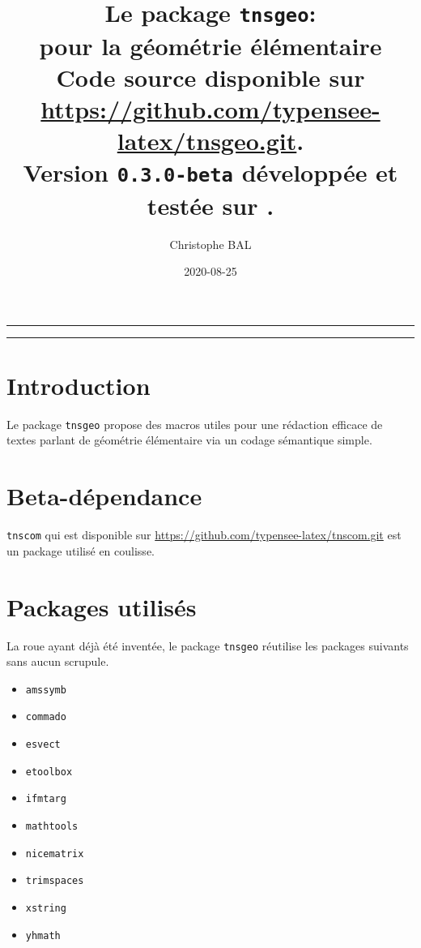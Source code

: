 \documentclass[12pt,a4paper]{article}
\theoremstyle{definition}
\begin{document}
\renewcommand\labelitemi{\raisebox{0.125em}{\tiny\textbullet}}
\renewcommand{\labelitemii}{---}

\title{  %
	Le package \texttt{tnsgeo}:\\%
	pour la géométrie élémentaire\\%
	{\footnotesize Code source disponible sur \url{https://github.com/typensee-latex/tnsgeo.git}.}\\%
{\footnotesize Version \texttt{0.3.0-beta} développée et testée sur \macosxname{}.}%
}
\author{Christophe BAL}
\date{2020-08-25}

\maketitle


\vspace{2em}

\hrule

\tableofcontents

\vspace{1.5em}

\hrule

\newpage

\section{Introduction}

Le package \verb+tnsgeo+ propose des macros utiles pour une rédaction efficace de textes parlant de géométrie élémentaire via un codage sémantique simple.


\section{Beta-dépendance}

\verb#tnscom# qui est disponible sur \url{https://github.com/typensee-latex/tnscom.git} est un package utilisé en coulisse.
\section{Packages utilisés}

La roue ayant déjà été inventée, le package \verb#tnsgeo# réutilise les packages suivants sans aucun scrupule.

\begin{multicols}{4}
    \begin{itemize}
        \item \verb#amssymb#
        \item \verb#commado#
        \item \verb#esvect#
        \item \verb#etoolbox#
        \item \verb#ifmtarg#
        \item \verb#mathtools#
        \item \verb#nicematrix#
        \item \verb#trimspaces#
        \item \verb#xstring#
        \item \verb#yhmath#
    \end{itemize}
\end{multicols}
\end{document}

